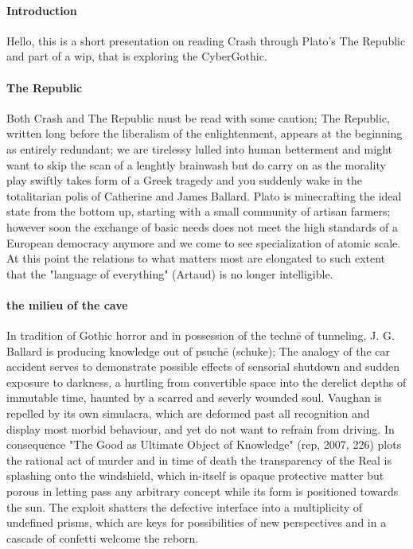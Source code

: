 \documentclass{article}
\begin{document}
\paragraph{Introduction} 
Hello, this is a short presentation on reading Crash through Plato's The Republic 
and part of a wip, that is exploring the CyberGothic.

\paragraph{The Republic}
Both Crash and The Republic must be read with some caution;
The Republic, written long before the liberalism of the enlightenment, 
appears at the beginning as entirely redundant; 
we are tirelessy lulled into human betterment and
might want to skip the scan of a lenghtly brainwash but do carry on as the morality play swiftly 
takes form of a Greek tragedy and you suddenly wake in the totalitarian polis 
of Catherine and James Ballard. 
Plato is minecrafting the ideal state from the bottom up, 
starting with a small community of artisan farmers;
however soon the exchange of basic needs does not meet the 
high standards of a European democracy anymore 
and we come to see specialization of atomic scale.
At this point the relations to what matters most 
are elongated to such extent 
that the "language of everything" (Artaud) is no longer intelligible.

\paragraph{the milieu of the cave} 
In tradition of Gothic horror and 
in possession of the techn\={e} of tunneling,
J. G. Ballard is producing knowledge out of psuch\={e} (schuke); 
The analogy of the car accident serves to demonstrate 
possible effects of sensorial shutdown and sudden exposure to darkness, 
a hurtling from convertible space 
into the derelict depths of immutable time, 
haunted by a scarred and severly wounded soul. 
Vaughan is repelled by its own simulacra, 
which are deformed past all recognition 
and display most morbid behaviour,
and yet do not want to refrain from driving. 
In consequence "The Good as Ultimate Object of Knowledge" (rep, 2007, 226) 
plots the rational act of murder 
and in time of death the transparency of the Real is splashing
onto the windshield, 
which in-itself is opaque protective matter 
but porous in letting pass any arbitrary concept while its 
form is positioned towards the sun. 
The exploit shatters the defective interface 
into a multiplicity of undefined prisms,
which are keys for possibilities of new perspectives 
and in a cascade of confetti welcome the reborn.
\end{document}
